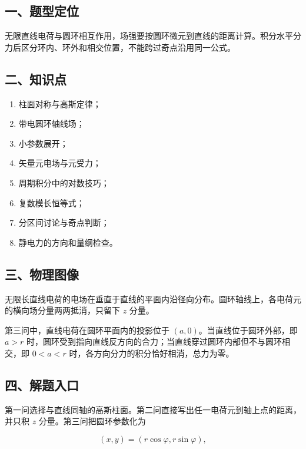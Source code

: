 \documentclass[12pt,a4paper,UTF8]{ctexart}
\newcommand{\tightlist}{\setlength{\itemsep}{0pt}\setlength{\parskip}{0pt}}
\begin{document}
\subsection{一、题型定位}\label{ux4e00ux9898ux578bux5b9aux4f4d-4}

无限直线电荷与圆环相互作用，场强要按圆环微元到直线的距离计算。积分水平分力后区分环内、环外和相交位置，不能跨过奇点沿用同一公式。

\subsection{二、知识点}\label{ux4e8cux77e5ux8bc6ux70b9-4}

\begin{enumerate}
\def\labelenumi{\arabic{enumi}.}
\tightlist
\item
  柱面对称与高斯定律；
\item
  带电圆环轴线场；
\item
  小参数展开；
\item
  矢量元电场与元受力；
\item
  周期积分中的对数技巧；
\item
  复数模长恒等式；
\item
  分区间讨论与奇点判断；
\item
  静电力的方向和量纲检查。
\end{enumerate}

\subsection{三、物理图像}\label{ux4e09ux7269ux7406ux56feux50cf-4}

无限长直线电荷的电场在垂直于直线的平面内沿径向分布。圆环轴线上，各电荷元的横向场分量两两抵消，只留下
\(z\) 分量。

第三问中，直线电荷在圆环平面内的投影位于
\((a,0)\)。当直线位于圆环外部，即 \(a>r\)
时，圆环受到指向直线反方向的合力；当直线穿过圆环内部但不与圆环相交，即
\(0<a<r\) 时，各方向分力的积分恰好相消，总力为零。

\subsection{四、解题入口}\label{ux56dbux89e3ux9898ux5165ux53e3-4}

第一问选择与直线同轴的高斯柱面。第二问直接写出任一电荷元到轴上点的距离，并只积
\(z\) 分量。第三问把圆环参数化为

\[
(x,y)=(r\cos\varphi,r\sin\varphi),
\]
\end{document}
